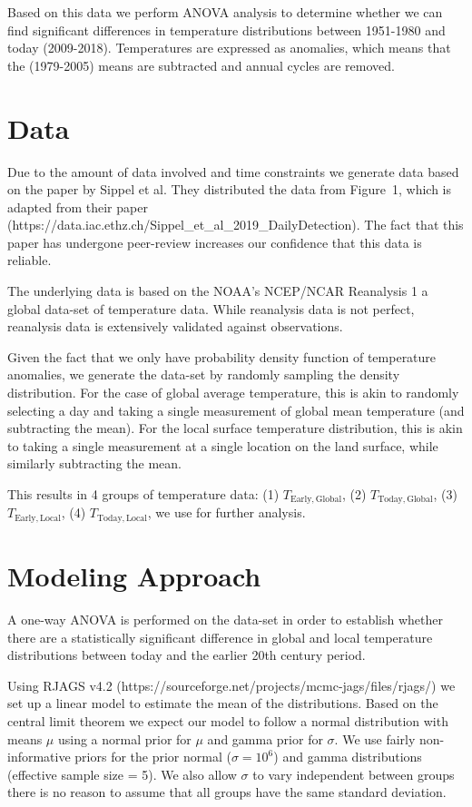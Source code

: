 \documentclass[letter, pt=10]{scrartcl}
\begin{document}
Based on this data we perform ANOVA analysis to determine whether we can find significant differences in temperature distributions between 1951-1980 and today (2009-2018). Temperatures are expressed as anomalies, which means that the (1979-2005) means are subtracted and annual cycles are removed.  

\section{Data}
 Due to the amount of data involved and time constraints we generate data based on the paper by Sippel et al. They distributed the data from Figure~1, which is adapted from their paper (https://data.iac.ethz.ch/Sippel\_et\_al\_2019\_DailyDetection). The fact that this paper has undergone peer-review increases our confidence that this data is reliable.

The underlying data is based on the NOAA's NCEP/NCAR Reanalysis 1 \cite{NCEP} a global data-set of temperature data. While reanalysis data is not perfect, reanalysis data is extensively validated against observations.  

Given the fact that we only have probability density function of temperature anomalies, we generate the data-set by randomly sampling the density distribution. For the case of global average temperature, this is akin to randomly selecting a day and taking a single measurement of global mean temperature (and subtracting the mean). For the local surface temperature distribution, this is akin to taking a single measurement at a single location on the land surface, while similarly subtracting the mean.

This results in 4 groups of temperature data: (1) $T_{\mathrm{Early,Global}}$, (2) $T_{\mathrm{ Today,Global}}$, (3) $T_{\mathrm{Early,Local}}$, (4) $T_{\mathrm{Today,Local}}$, we use for further analysis.

\section{Modeling Approach}
A one-way ANOVA is performed on the data-set in order to establish whether there are a statistically significant difference in global and local temperature distributions between today and the earlier 20th century period. 

Using RJAGS v4.2 (https://sourceforge.net/projects/mcmc-jags/files/rjags/) we set up a linear model to estimate the mean of the distributions. Based on the central limit theorem we expect our model to follow a normal distribution with means $\mu$ using a normal prior for $\mu$ and gamma prior for $\sigma$. We use fairly non-informative priors for the prior normal ($\sigma = 10^6$) and gamma distributions (effective sample size = 5). We also allow $\sigma$ to vary independent between groups there is no reason to assume that all groups have the same standard deviation. 
\end{document}
